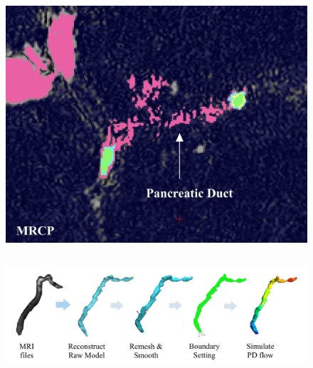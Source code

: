 \documentclass{beamer}
\begin{document}
\begin{frame}
\begin{columns}
\begin{column}{0.4\textwidth}
            \begin{figure}[H]
                \centering
                \includegraphics[width=\textwidth]{figures/MRCP.jpg}
            \end{figure}
        \end{column}
    \end{columns}

    \vspace{0.05\textwidth}



    \begin{figure}[H]
        \centering
        \includegraphics[width=\textwidth]{figures/Process-CFX_Total.jpg}
    \end{figure}

\end{frame}
\end{document}
